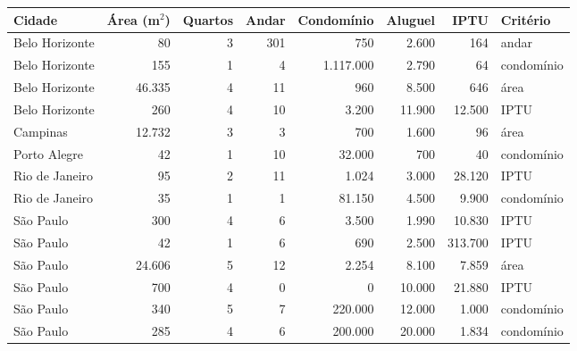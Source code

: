 \begin{tabular}{lrrrrrrl}
\toprule
Cidade & Área (m$^2$) & Quartos & Andar & Condomínio & Aluguel & IPTU & Critério \\
\midrule
Belo Horizonte & 80 & 3 & 301 & 750 & 2.600 & 164 & andar \\
Belo Horizonte & 155 & 1 & 4 & 1.117.000 & 2.790 & 64 & condomínio \\
Belo Horizonte & 46.335 & 4 & 11 & 960 & 8.500 & 646 & área \\
Belo Horizonte & 260 & 4 & 10 & 3.200 & 11.900 & 12.500 & IPTU \\
Campinas & 12.732 & 3 & 3 & 700 & 1.600 & 96 & área \\
Porto Alegre & 42 & 1 & 10 & 32.000 & 700 & 40 & condomínio \\
Rio de Janeiro & 95 & 2 & 11 & 1.024 & 3.000 & 28.120 & IPTU \\
Rio de Janeiro & 35 & 1 & 1 & 81.150 & 4.500 & 9.900 & condomínio \\
São Paulo & 300 & 4 & 6 & 3.500 & 1.990 & 10.830 & IPTU \\
São Paulo & 42 & 1 & 6 & 690 & 2.500 & 313.700 & IPTU \\
São Paulo & 24.606 & 5 & 12 & 2.254 & 8.100 & 7.859 & área \\
São Paulo & 700 & 4 & 0 & 0 & 10.000 & 21.880 & IPTU \\
São Paulo & 340 & 5 & 7 & 220.000 & 12.000 & 1.000 & condomínio \\
São Paulo & 285 & 4 & 6 & 200.000 & 20.000 & 1.834 & condomínio \\
\bottomrule
\end{tabular}
